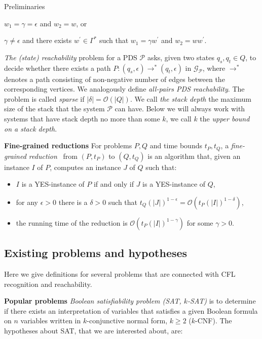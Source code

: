 \documentclass[12pt]{article}
\let\origenumerate\enumerate
\let\origendenumerate\endenumerate
\renewenvironment{enumerate}{\origenumerate[topsep = 0pt, noitemsep]}{\origendenumerate}
\begin{document}
\begin{section}{Preliminaries}
\begin{enumerate}
    \item $w_1 = \gamma = \epsilon$ and $w_2 =w$, or
    \item $\gamma \neq \epsilon$ and there exists $w^{\prime} \in \Gamma^*$ such that $w_1 =\gamma w^{\prime}$ and $w_2 = ww^{\prime}$.
\end{enumerate}

\textit{The (state) reachability} problem for a PDS $\mathcal{P}$ asks, given two states $q_s,q_t \in Q$, to decide whether there exists a path $P: (q_s , \epsilon) \rightarrow^* (q_t , \epsilon)$ in $\mathcal{G}_{\mathcal{P}}$, where $\rightarrow^*$ denotes a path consisting of non-negative number of edges between the corresponding vertices. We analogously define \emph{all-pairs PDS reachability}. The problem is called \textit{sparse} if $| \delta | = \mathcal{O}(|Q|)$. We call \emph{the stack depth} the maximum size of the stack that the system $\mathcal{P}$ can have. Below we will always work with systems that have stack depth no more than some $k$, we call $k$ the \emph{upper bound on a stack depth}.
	
\textbf{Fine-grained reductions}
	For problems $P, Q$ and time bounds $t_P, t_Q$, a \emph{fine-grained reduction}~\cite{bringmann2019fine} from $(P, t_P)$ to $(Q, t_Q)$ is an algorithm that, given an instance $I$ of $P$, computes an instance $J$ of $Q$ such that: 
	
	\begin{itemize}
		\item $I$ is a YES-instance of $P$ if and only if $J$ is a YES-instance of $Q$,
		\item for any $\epsilon > 0$ there is a $\delta > 0$ such that $t_Q(|J|)^{1 - \epsilon} = \mathcal{O}(t_P (|I|)^{1 - \delta})$, 
		\item the running time of the reduction is $\mathcal{O}(t_P (|I|)^{1 - \gamma})$ for some $\gamma > 0$.
	\end{itemize}

\subsection{Existing problems and hypotheses}
	
    Here we give definitions for several problems that are connected with CFL recognition and reachability. 
	
\textbf{Popular problems}
	\emph{Boolean satisfiability problem (SAT, $k$-SAT)} is to determine if there exists an interpretation of variables that satisfies a given Boolean formula on $n$ variables written in $k$-conjunctive normal form, $k \ge 2$ ($k$-CNF). The hypotheses about SAT, that we are interested about, are:
	

\end{section}
\end{document}
